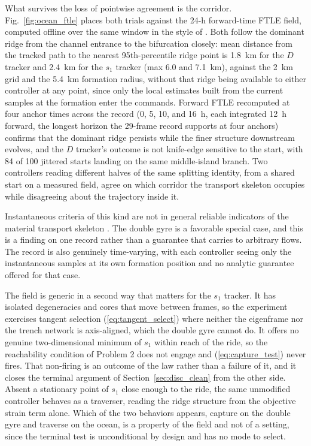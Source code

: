 \documentclass[lettersize,journal]{IEEEtran}
\begin{document}
What survives the loss of pointwise agreement is the corridor.
Fig.~\ref{fig:ocean_ftle} places both trials against the 24-h forward-time
FTLE field, computed offline over the same window in the style of
\cite{15}. Both follow the dominant ridge from the channel entrance to the
bifurcation closely: mean distance from the tracked path to the nearest
95th-percentile ridge point is 1.8~km for the $D$ tracker and 2.4~km for
the $s_1$ tracker (max 6.0 and 7.1~km), against the 2~km grid and the
5.4~km formation radius, without that ridge being available to either
controller at any point, since only the local estimates built from the
current samples at the formation enter the commands. Forward FTLE
recomputed at four anchor times across the record (0, 5, 10, and 16~h,
each integrated 12~h forward, the longest horizon the 29-frame record
supports at four anchors) confirms that the dominant ridge
persists while the finer structure downstream evolves, and the $D$
tracker's outcome is not knife-edge sensitive to the start, with 84 of 100
jittered starts landing on the same middle-island branch. Two controllers
reading different halves of the same splitting identity, from a shared
start on a measured field, agree on which corridor the transport skeleton
occupies while disagreeing about the trajectory inside it.

Instantaneous criteria of this kind are not in general reliable indicators
of the material transport skeleton \cite{23}. The double gyre is a
favorable special case, and this is a finding on one record rather than a
guarantee that carries to arbitrary flows. The record is also genuinely
time-varying, with each controller seeing only the instantaneous samples at
its own formation position and no analytic guarantee offered for that case.

The field is generic in a second way that matters for the $s_1$ tracker. It
has isolated degeneracies and cores that move between frames, so the
experiment exercises tangent selection (\ref{eq:tangent_select}) where
neither the eigenframe nor the trench network is axis-aligned, which the
double gyre cannot do. It offers no genuine two-dimensional minimum of
$s_1$ within reach of the ride, so the reachability condition of Problem 2
does not engage and (\ref{eq:capture_test}) never fires. That non-firing is
an outcome of the law rather than a failure of it, and it closes the
terminal argument of Section~\ref{sec:disc_clean} from the other side.
Absent a stationary point of $s_1$ close enough to the ride, the same
unmodified controller behaves as a traverser, reading the ridge structure
from the objective strain term alone. Which of the two behaviors appears,
capture on the double gyre and traverse on the ocean, is a property of the
field and not of a setting, since the terminal test is unconditional by
design and has no mode to select.
\end{document}
